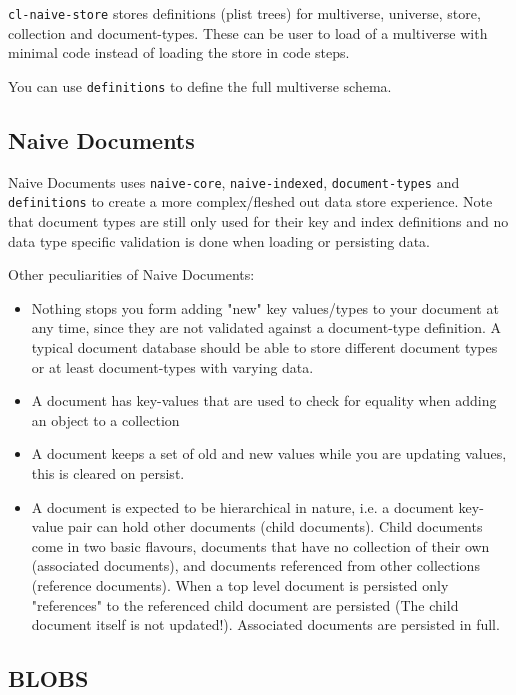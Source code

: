 \documentclass[11pt]{article}
\begin{document}
\texttt{cl-naive-store} stores definitions (plist trees) for multiverse,
universe, store, collection and document-types. These can be user to
load of a multiverse with minimal code instead of loading the store in
code steps.

You can use \texttt{definitions} to define the full multiverse schema.

\subsection{Naive Documents}
\label{sec:org4becc92}

Naive Documents uses \texttt{naive-core}, \texttt{naive-indexed}, \texttt{document-types}
and \texttt{definitions} to create a more complex/fleshed out data store
experience. Note that document types are still only used for their key
and index definitions and no data type specific validation is done
when loading or persisting data.

Other peculiarities of Naive Documents:

\begin{itemize}
\item Nothing stops you form adding "new" key values/types to your
document at any time, since they are not validated against a
document-type definition. A typical document database should be able
to store different document types or at least document-types with
varying data.
\item A document has key-values that are used to check for equality when
adding an object to a collection
\item A document keeps a set of old and new values while you are updating
values, this is cleared on persist.
\item A document is expected to be hierarchical in nature, i.e. a document
key-value pair can hold other documents (child documents). Child
documents come in two basic flavours, documents that have no
collection of their own (associated documents), and documents
referenced from other collections (reference documents). When a top
level document is persisted only "references" to the referenced
child document are persisted (The child document itself is not
updated!). Associated documents are persisted in full.
\end{itemize}

\subsection{BLOBS}
\label{sec:orgd76f9e9}
\end{document}

